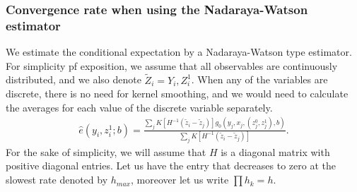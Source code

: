 \documentclass{article}
\theoremstyle{definition}
\theoremstyle{remark}
\begin{document}
\subsubsection{Convergence rate when using the Nadaraya-Watson estimator}
We estimate the conditional expectation by a Nadaraya-Watson type estimator. For simplicity pf exposition, we assume that all observables are continuously distributed, and we also denote $\tilde{Z}_i = Y_i, Z_i^1$. When any of the variables are discrete, there is no need for kernel smoothing, and we would need to calculate the averages for each value of the discrete variable separately.
\begin{align}
    \hat{e}(y_i, z_i^1; b)= \frac{\sum_j K[H^{-1}(\tilde{z}_i-\tilde{z}_j)] g_0(y_j, x_j, (z_j^0, z_j^1), b)}{\sum_j K[H^{-1}(\tilde{z}_i-\tilde{z}_j)]}.
\end{align}
For the sake of simplicity, we will assume that $H$ is a diagonal matrix with positive diagonal entries. Let us have the entry that decreases to zero at the slowest rate denoted by $h_{max}$, moreover let us write $\prod h_k= h$.
\end{document}
